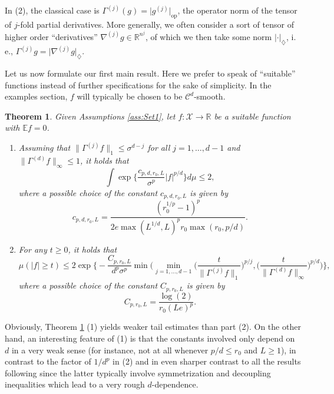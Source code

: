 \documentclass[a4paper,12pt]{amsart}
\numberwithin{equation}{section}
\newtheorem{satz}{Theorem}[section]
\theoremstyle{remark}
\def\E{{\mathbb E}}
\def\R{{\mathbb R}}
\begin{document}
In (2), the classical case is $\Gamma^{(j)}(g) = \lvert g^{(j)} \rvert_\mathrm{op}$, the operator norm of the tensor of $j$-fold partial derivatives. More generally, we often consider a sort of tensor of higher order ``derivatives'' $\nabla^{(j)} g \in \R^{n^j}$, of which we then take some norm $\lvert \cdot \rvert_\diamondsuit$, i.\,e., $\Gamma^{(j)} g = \lvert \nabla^{(j)} g \rvert_\diamondsuit$.

Let us now formulate our first main result. Here we prefer to speak of ``suitable'' functions instead of further specifications for the sake of simplicity. In the examples section, $f$ will typically be chosen to be $\mathcal{C}^d$-smooth.

\begin{satz}\label{thm:HigherOrder}
    Given Assumptions \ref{ass:Set1}, let $f\colon \mathcal{X} \to \R$ be a suitable function with $\E f = 0$.
    \begin{enumerate}
        \item Assuming that $\lVert \Gamma^{(j)} f \rVert_1 \le \sigma^{d-j}$ for all $j=1,\ldots,d-1$ and $\lVert \Gamma^{(d)} f \rVert_\infty \le 1$, it holds that
        \[
        \int \exp\Big\{\frac{c_{p,d,r_0,L}}{\sigma^p} |f|^{p/d} \Big\} d\mu \le 2,
        \]
        where a possible choice of the constant $c_{p,d,r_0,L}$ is given by
        \[
        c_{p,d,r_0,L} = \frac{(r_0^{1/p}-1)^p}{2e\max(L^{1/d}, L)^pr_0\max(r_0,p/d)}.
        \]
        \item For any $t\ge 0$, it holds that
        \[
        \mu(|f| \ge t)\le
        2 \exp\Big\{- \frac{C_{p,r_0,L}}{d^p\sigma^p} \min\Big(\min_{j=1, \ldots,d-1} \Big(\frac{t}{\lVert \Gamma^{(j)} f \rVert_1}\Big)^{p/j}, \Big(\frac{t}{\lVert \Gamma^{(d)} f \rVert_\infty}\Big)^{p/d}\Big)\Big\},
        \]
    where a possible choice of the constant $C_{p,r_0,L}$ is given by
    \[
    C_{p,r_0,L} = \frac{\log(2)}{r_0(Le)^p}.
    \]
    \end{enumerate}
\end{satz}

Obviously, Theorem \ref{thm:HigherOrder} (1) yields weaker tail estimates than part (2). On the other hand, an interesting feature of (1) is that the constants involved only depend on $d$ in a very weak sense (for instance, not at all whenever $p/d \le r_0$ and $L \ge 1$), in contrast to the factor of $1/d^p$ in (2) and in even sharper contrast to all the results following \cite{Lat06} since the latter typically involve symmetrization and decoupling inequalities which lead to a very rough $d$-dependence.
\end{document}
